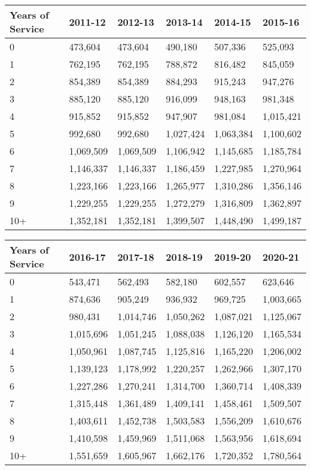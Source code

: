 \documentclass[
]{book}
\begin{document}
\begin{longtable}[]{@{}llllll@{}}
\toprule()
Years of Service & 2011-12 & 2012-13 & 2013-14 & 2014-15 & 2015-16 \\
\midrule()
\endhead
0 & 473,604 & 473,604 & 490,180 & 507,336 & 525,093 \\
1 & 762,195 & 762,195 & 788,872 & 816,482 & 845,059 \\
2 & 854,389 & 854,389 & 884,293 & 915,243 & 947,276 \\
3 & 885,120 & 885,120 & 916,099 & 948,163 & 981,348 \\
4 & 915,852 & 915,852 & 947,907 & 981,084 & 1,015,421 \\
5 & 992,680 & 992,680 & 1,027,424 & 1,063,384 & 1,100,602 \\
6 & 1,069,509 & 1,069,509 & 1,106,942 & 1,145,685 & 1,185,784 \\
7 & 1,146,337 & 1,146,337 & 1,186,459 & 1,227,985 & 1,270,964 \\
8 & 1,223,166 & 1,223,166 & 1,265,977 & 1,310,286 & 1,356,146 \\
9 & 1,229,255 & 1,229,255 & 1,272,279 & 1,316,809 & 1,362,897 \\
10+ & 1,352,181 & 1,352,181 & 1,399,507 & 1,448,490 & 1,499,187 \\
\bottomrule()
\end{longtable}

\newpage

\begin{longtable}[]{@{}llllll@{}}
\toprule()
Years of Service & 2016-17 & 2017-18 & 2018-19 & 2019-20 & 2020-21 \\
\midrule()
\endhead
0 & 543,471 & 562,493 & 582,180 & 602,557 & 623,646 \\
1 & 874,636 & 905,249 & 936,932 & 969,725 & 1,003,665 \\
2 & 980,431 & 1,014,746 & 1,050,262 & 1,087,021 & 1,125,067 \\
3 & 1,015,696 & 1,051,245 & 1,088,038 & 1,126,120 & 1,165,534 \\
4 & 1,050,961 & 1,087,745 & 1,125,816 & 1,165,220 & 1,206,002 \\
5 & 1,139,123 & 1,178,992 & 1,220,257 & 1,262,966 & 1,307,170 \\
6 & 1,227,286 & 1,270,241 & 1,314,700 & 1,360,714 & 1,408,339 \\
7 & 1,315,448 & 1,361,489 & 1,409,141 & 1,458,461 & 1,509,507 \\
8 & 1,403,611 & 1,452,738 & 1,503,583 & 1,556,209 & 1,610,676 \\
9 & 1,410,598 & 1,459,969 & 1,511,068 & 1,563,956 & 1,618,694 \\
10+ & 1,551,659 & 1,605,967 & 1,662,176 & 1,720,352 & 1,780,564 \\
\bottomrule()
\end{longtable}
\end{document}
